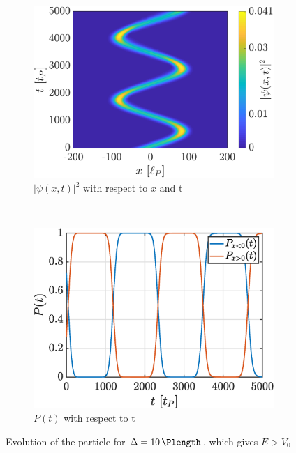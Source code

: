 \documentclass[a4paper,12pt,twoside]{article}
\begin{document}
    \begin{figure}[h]
      \centering
      \begin{subfigure}[t]{0.45\textwidth}
        \includegraphics[width=\textwidth]{graphs/iii_evo_Egeqv0_evo.eps}
        \caption{$|\psi(x, t)|^2$ with respect to $x$ and t}
        \label{fig:iii_evo_Egeqv0_evo}
      \end{subfigure}
      ~
      \begin{subfigure}[t]{0.45\textwidth}
        \includegraphics[width=\textwidth]{graphs/iii_evo_Egeqv0_prob.eps}
        \caption{$P(t)$ with respect to t}
        \label{fig:iii_evo_Egeqv0_prob}
      \end{subfigure}
      \caption{Evolution of the particle for $\Delta = \SI{10}{\Plength}$, which gives $E > V_0$}
      \label{fig:iii_evo_Egeqv0}
    \end{figure}
\end{document}
